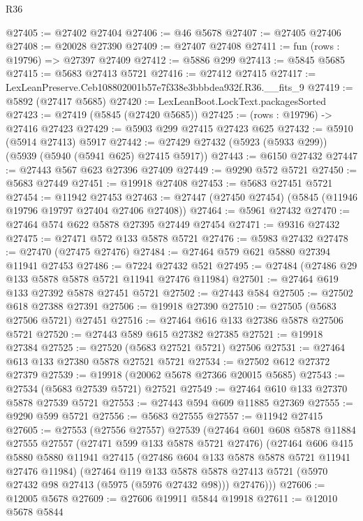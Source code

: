 \begin{lexlean}{R36}
\begin{coremodule}
@27405 := @27402 @27404
@27406 := @46 @5678
@27407 := @27405 @27406
@27408 := @20028 @27390
@27409 := @27407 @27408
@27411 := fun (rows : @19796) => @27397 @27409
@27412 := @5886 @299
@27413 := @5845 @5685
@27415 := @5683 @27413 @5721
@27416 := @27412 @27415
@27417 := LexLeanPreserve.Ceb108802001b57e7f338e3bbbdea932f.R36.__fits_9
@27419 := @5892 (@27417 @5685)
@27420 := LexLeanBoot.LockText.packagesSorted
@27423 := @27419 (@5845 (@27420 @5685))
@27425 := (rows : @19796) -> @27416 @27423
@27429 := @5903 @299 @27415 @27423 @625
@27432 := @5910 (@5914 @27413) @5917
@27442 := @27429 @27432 (@5923 (@5933 @299)) (@5939 (@5940 (@5941 @625) @27415 @5917))
@27443 := @6150 @27432
@27447 := @27443 @567 @623 @27396 @27409
@27449 := @9290 @572 @5721
@27450 := @5683 @27449
@27451 := @19918 @27408
@27453 := @5683 @27451 @5721
@27454 := @11942 @27453
@27463 := @27447 (@27450 @27454) (@5845 (@11946 @19796 @19797 @27404 @27406 @27408))
@27464 := @5961 @27432
@27470 := @27464 @574 @622 @5878 @27395 @27449 @27454
@27471 := @9316 @27432
@27475 := @27471 @572 @133 @5878 @5721
@27476 := @5983 @27432
@27478 := @27470 (@27475 @27476)
@27484 := @27464 @579 @621 @5880 @27394 @11941 @27453
@27486 := @7224 @27432 @521
@27495 := @27484 (@27486 @29 @133 @5878 @5878 @5721 @11941 @27476 @11984)
@27501 := @27464 @619 @133 @27392 @5878 @27451 @5721
@27502 := @27443 @584
@27505 := @27502 @618 @27388 @27391
@27506 := @19918 @27390
@27510 := @27505 (@5683 @27506 @5721) @27451
@27516 := @27464 @616 @133 @27386 @5878 @27506 @5721
@27520 := @27443 @589 @615 @27382 @27385
@27521 := @19918 @27384
@27525 := @27520 (@5683 @27521 @5721) @27506
@27531 := @27464 @613 @133 @27380 @5878 @27521 @5721
@27534 := @27502 @612 @27372 @27379
@27539 := @19918 (@20062 @5678 @27366 @20015 @5685)
@27543 := @27534 (@5683 @27539 @5721) @27521
@27549 := @27464 @610 @133 @27370 @5878 @27539 @5721
@27553 := @27443 @594 @609 @11885 @27369
@27555 := @9290 @599 @5721
@27556 := @5683 @27555
@27557 := @11942 @27415
@27605 := @27553
    (@27556 @27557)
    @27539
    (@27464
      @601
      @608
      @5878
      @11884
      @27555
      @27557
      (@27471 @599 @133 @5878 @5721 @27476)
      (@27464
        @606
        @415
        @5880
        @5880
        @11941
        @27415
        (@27486 @604 @133 @5878 @5878 @5721 @11941 @27476 @11984)
        (@27464
          @119
          @133
          @5878
          @5878
          @27413
          @5721
          (@5970 @27432 @98 @27413 (@5975 (@5976 @27432 @98)))
          @27476)))
@27606 := @12005 @5678
@27609 := @27606 @19911 @5844 @19918
@27611 := @12010 @5678 @5844

\end{coremodule}
\end{lexlean}
